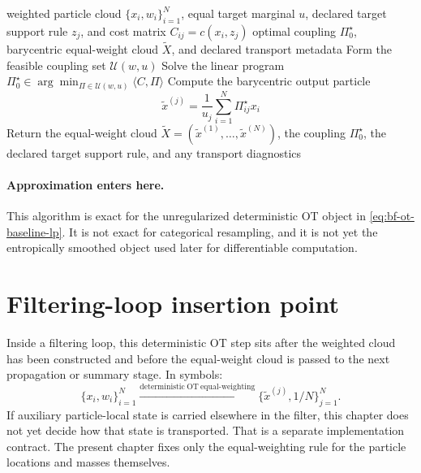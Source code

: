 \begin{algorithm}[ht]
\caption{\texttt{deterministic\_ot\_equalweight\_step}}
\begin{algorithmic}[1]
\Require weighted particle cloud \(\{x_i,w_i\}_{i=1}^N\), equal target marginal \(u\), declared target support rule \(z_j\), and cost matrix \(C_{ij}=c(x_i,z_j)\)
\Ensure optimal coupling \(\Pi_0^\star\), barycentric equal-weight cloud \(\widetilde X\), and declared transport metadata
\State Form the feasible coupling set \(\mathcal U(w,u)\)
\State Solve the linear program \(\Pi_0^\star\in\arg\min_{\Pi\in\mathcal U(w,u)} \langle C,\Pi\rangle\)
  \State Compute the barycentric output particle
  \[
    \tilde x^{(j)} = \frac{1}{u_j}\sum_{i=1}^N \Pi_{ij}^\star x_i
  \]
\EndFor
\State Return the equal-weight cloud \(\widetilde X=(\tilde x^{(1)},\ldots,\tilde x^{(N)})\), the coupling \(\Pi_0^\star\), the declared target support rule, and any transport diagnostics
\end{algorithmic}
\end{algorithm}

\paragraph{Approximation enters here.}
This algorithm is exact for the unregularized deterministic OT object in
\eqref{eq:bf-ot-baseline-lp}.  It is not exact for categorical resampling, and it
is not yet the entropically smoothed object used later for differentiable
computation.

\section{Filtering-loop insertion point}
\label{sec:bf-ot-baseline-loop}

Inside a filtering loop, this deterministic OT step sits after the weighted cloud
has been constructed and before the equal-weight cloud is passed to the next
propagation or summary stage.  In symbols:
\begin{equation}
\label{eq:bf-ot-baseline-loop}
  \{x_i,w_i\}_{i=1}^N
  \xrightarrow{\mathrm{deterministic\ OT\ equal\text{-}weighting}}
  \{\tilde x^{(j)},1/N\}_{j=1}^N.
\end{equation}
If auxiliary particle-local state is carried elsewhere in the filter, this chapter
does not yet decide how that state is transported.  That is a separate
implementation contract.  The present chapter fixes only the equal-weighting rule
for the particle locations and masses themselves.

